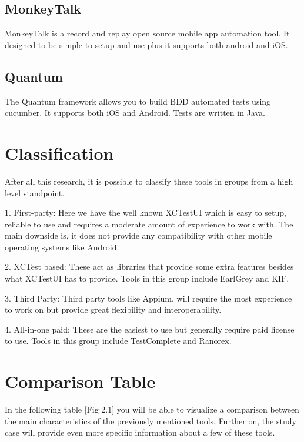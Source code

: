 \subsection {MonkeyTalk}
MonkeyTalk is a record and replay open source mobile app automation tool. It designed to be simple to setup and use plus it supports both android and iOS. \cite{MonkeyTalk}

\subsection {Quantum}
The Quantum framework allows you to build BDD automated tests using cucumber. It supports both iOS and Android. Tests are written in Java. \cite{Quantum}

\section{Classification}
After all this research, it is possible to classify these tools in groups from a high level standpoint.

1. First-party: Here we have the well known XCTestUI which is easy to setup, reliable to use and requires a moderate amount of experience to work with. The main downside is, it does not provide any compatibility with other mobile operating systems like Android.

2. XCTest based: These act as libraries that provide some extra features besides what XCTestUI has to provide. Tools in this group include EarlGrey and KIF.

3. Third Party: Third party tools like Appium, will require the most experience to work on but provide great flexibility and interoperability.

4. All-in-one paid:  These are the easiest to use but generally require paid license to use. Tools in this group include TestComplete and Ranorex.

\section{Comparison Table}

In the following table [Fig 2.1] you will be able to visualize a comparison between the main characteristics of the previously mentioned tools. Further on, the study case will provide even more specific information about a few of these tools.

